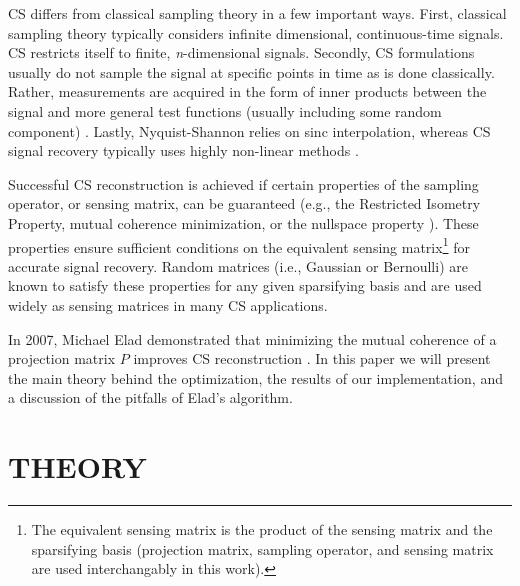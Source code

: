 \documentclass[journal]{IEEEtran}
\begin{document}
CS differs from classical sampling theory in a few important ways.  First, classical sampling theory typically considers infinite dimensional, continuous-time signals.  CS restricts itself to finite, \emph{n}-dimensional signals.  Secondly, CS formulations usually do not sample the signal at specific points in time as is done classically.  Rather, measurements are acquired in the form of inner products between the signal and more general test functions (usually including some random component) \cite{csbook}.  Lastly, Nyquist-Shannon relies on sinc interpolation, whereas CS signal recovery typically uses highly non-linear methods \cite{csbook}.

Successful CS reconstruction is achieved if certain properties of the sampling operator, or sensing matrix, can be guaranteed (e.g., the Restricted Isometry Property, mutual coherence minimization, or the nullspace property \cite{tcs}).  These properties ensure sufficient conditions on the equivalent sensing matrix\footnote{The equivalent sensing matrix is the product of the sensing matrix and the sparsifying basis (projection matrix, sampling operator, and sensing matrix are used interchangably in this work).} for accurate signal recovery. Random matrices (i.e., Gaussian or Bernoulli) are known to satisfy these properties for any given sparsifying basis and are used widely as sensing matrices in many CS applications.

In 2007, Michael Elad demonstrated that minimizing the mutual coherence of a projection matrix $P$ improves CS reconstruction \cite{elad}.  In this paper we will present the main theory behind the optimization, the results of our implementation, and a discussion of the pitfalls of Elad's algorithm.

\section{THEORY}
\end{document}
